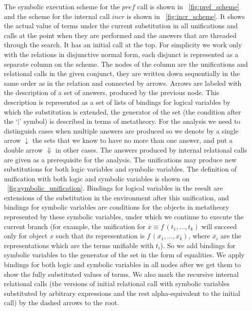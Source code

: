 The symbolic execution scheme for the $pref$ call is shown in \figureword~\ref{fig:pref_scheme} and the scheme for the internal call $incr$ is shown in \figureword~\ref{fig:incr_scheme}. It shows the actual value of terms under the current
substitution in all unifications and calls at the point when they are performed and the answers that are threaded through the search. It has an initial call at the top.
For simplicity we work only with the relations in disjunctive normal form, each disjunct is represented as a separate column on the scheme. The nodes of the column are
the unifications and relational calls in the given conjunct, they are written down sequentially in the same order as in the relation and connected by arrows. Arrows are
labeled with the description of a set of answers, produced by the previous node. This description is represented as a set of lists of bindings for logical variables by which the
substitution is extended, the generator of the set (the condition after the `$\mid$' symbol) is described in terms of metatheory. For the analysis we need to distinguish
cases when multiple answers are produced so we denote by a single arrow $\downarrow$ the sets that we know to have no more than one answer, and put a double arrow $\Downarrow$
in other cases. The answers produced by internal relational calls are given as a prerequisite for the analysis. The unifications may produce new substitutions for
both logic variables and symbolic variables. The definition of unification with both logic and symbolic variables is shown on \figureword~\ref{fig:symbolic_unification}.
Bindings for logical variables in the result are extensions of the substitution in the environment after this unification, and bindings for symbolic variables are conditions
for the objects in metatheory represented by these symbolic variables, under which we continue to execute the current branch (for example, the unification for $\overline{x} \equiv f\,(t_1, \dots, t_k)$ will succeed only for object $x$ such that its representation is $f\,(\overline{x_1}, \dots, \overline{x_k})$, where $\overline{x_i}$ are the representations which are the terms
unifiable with $t_i$). So we add bindings for symbolic variables to the generator of the set in the form of equalities. We apply bindings for both logic and symbolic variables in
all nodes after we get them to show the fully substituted values of terms. We also mark the recursive internal relational calls (the versions of initial relational call with
symbolic variables substituted by arbitrary expressions and the rest alpha-equivalent to the initial call) by the dashed arrows to the root.

